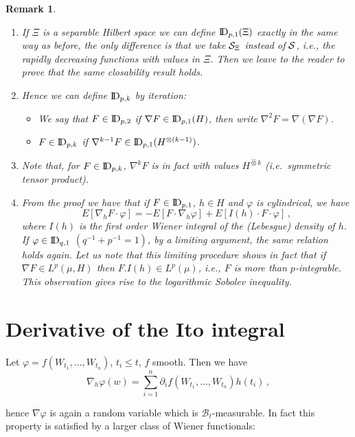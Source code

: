 \documentclass[12pt,a4paper]{book}
\newtheorem{remarkk}[theorem]{Remark}
\newcommand{\DD}{{\rm I\!D}}
\newcommand{\calS}{{\cal S}}
\begin{document}
\begin{remarkk}{\rm
\begin{enumerate}
\item  If ${\Xi}$ is a separable Hilbert space we can define
  $\DD_{p,1}({\Xi})$ exactly in the same way as before, the
  only difference is that we take ${\calS}_{\Xi}$ instead of
  ${\calS}$, i.e., the rapidly decreasing functions with
values in $\Xi$. Then we leave to the reader to prove that  the
same closability result holds.
\item Hence we can define $\DD_{p,k}$ by iteration:
\begin{itemize}
\item[i)]
We say that $F\in \DD_{p,2}$ if $\nabla F\in \DD_{p,1}(H)$, then write
$\nabla^2F=\nabla(\nabla F)$.
\item[ii)]
$F\in \DD_{p,k}$ if $\nabla^{k-1}F\in \DD_{p,1}(H^{\otimes(k-1)})$.
\end{itemize}

\item  Note that, for $F\in \DD_{p,k}$, $\nabla^kF$ is in fact with values
$H^{\widehat{\otimes}k}$ (i.e.\ symmetric tensor product).
\index[not]{d@$\DD_{p,k}(X)$}
\item From the proof we have that if $F\in \DD_{p,1}$, $h\in H$ and $\varphi$ is
cylindrical, we have
$$
E[\nabla_h F\cdot\varphi]=-E[F\cdot\nabla_h\varphi]
  +E[I(h)\cdot F\cdot\varphi]\,,
$$
where $I(h)$ is the first order Wiener integral of the (Lebesgue) density
of $h$.
\noindent
If $\varphi\in \DD_{q,1}$ $(q^{-1}+p^{-1}=1)$, by a limiting argument, the same
relation holds  again. Let us note that this limiting procedure shows
in fact that if $\nabla F\in L^p(\mu,H)$ then $F.I(h)\in L^p(\mu)$,
i.e., $F$ is more than $p$-integrable. This observation gives rise to
the logarithmic Sobolev inequality.
\end{enumerate}
}
\end{remarkk}

\section{Derivative of  the Ito  integral}

Let $\varphi=f(W_{t_1},\ldots,W_{t_n})$, $t_i\leq t$, $f$ smooth. Then we have
$$\nabla_h\varphi(w)=\sum_{i=1}^n \partial_if(W_{t_1},\ldots,W_{t_n})h(t_i)\,,$$

\noindent
hence $\nabla\varphi$ is again a random variable which is ${\mathcal
B}_t$-measurable. In fact this property is satisfied by a larger
class of Wiener functionals:
\end{document}
